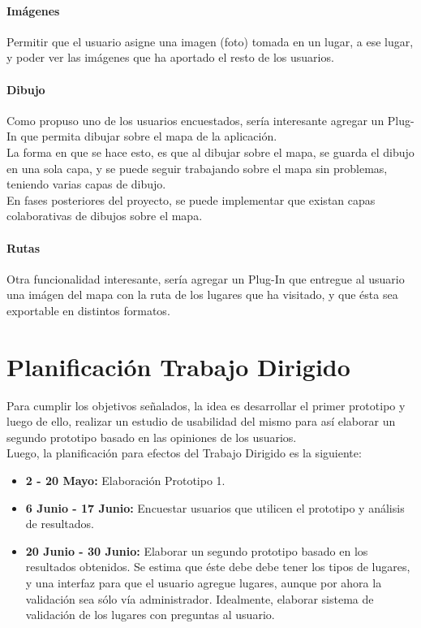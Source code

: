 \documentclass[10pt,letterpaper]{article}
\begin{document}
\paragraph{Imágenes}

Permitir que el usuario asigne una imagen (foto) tomada en un lugar, a ese lugar, y poder ver las imágenes que ha aportado el resto de los usuarios.\\

\paragraph{Dibujo}

Como propuso uno de los usuarios encuestados, sería interesante agregar un Plug-In que permita dibujar sobre el mapa de la aplicación.\\

La forma en que se hace esto, es que al dibujar sobre el mapa, se guarda el dibujo en una sola capa, y se puede seguir trabajando sobre el mapa sin problemas, teniendo varias capas de dibujo.\\

En fases posteriores del proyecto, se puede implementar que existan capas colaborativas de dibujos sobre el mapa.\\

\paragraph{Rutas}

Otra funcionalidad interesante, sería agregar un Plug-In que entregue al usuario una imágen del mapa con la ruta de los lugares que ha visitado, y que ésta sea exportable en distintos formatos.\\ 

\newpage
\section{Planificación Trabajo Dirigido}

Para cumplir los objetivos señalados, la idea es desarrollar el primer prototipo y luego de ello, realizar un estudio de usabilidad del mismo para así elaborar un segundo prototipo basado en las opiniones de los usuarios.\\

Luego, la planificación para efectos del Trabajo Dirigido es la siguiente:\\

\begin{itemize}
\item \textbf{2 - 20 Mayo:} Elaboración Prototipo 1.
\item \textbf{6 Junio - 17 Junio:} Encuestar usuarios que utilicen el prototipo y análisis de resultados.
 \item \textbf{20 Junio - 30 Junio:} Elaborar un segundo prototipo basado en los resultados obtenidos. Se estima que éste debe debe tener los tipos de lugares, y una interfaz para que el usuario agregue lugares, aunque por ahora la validación sea sólo vía administrador. Idealmente, elaborar sistema de validación de los lugares con preguntas al usuario.
\end{itemize}
\end{document}
